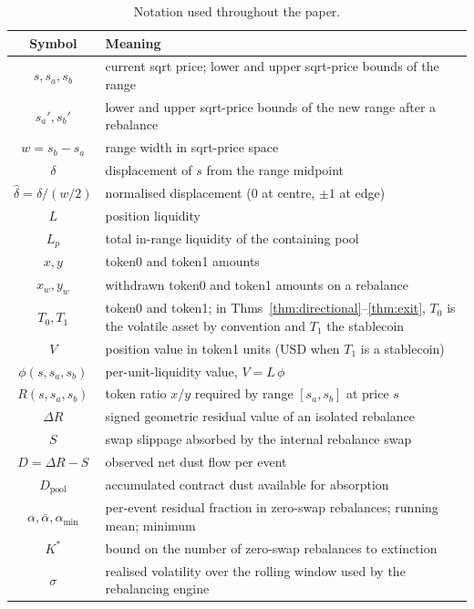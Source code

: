 \documentclass{manuscript}
\renewcommand{\arraystretch}{1.2}
\begin{document}
\begin{table}[H]
\centering
\caption{Notation used throughout the paper.}
\label{tab:notation}
\footnotesize
\renewcommand{\arraystretch}{1.05}
\begin{tabular}{@{}cL{10cm}@{}}
\toprule
Symbol & Meaning \\
\midrule
$s, s_a, s_b$ & current sqrt price; lower and upper sqrt-price bounds of the range \\
$s_a', s_b'$ & lower and upper sqrt-price bounds of the new range after a rebalance \\
$w = s_b - s_a$ & range width in sqrt-price space \\
$\delta$ & displacement of $s$ from the range midpoint \\
$\hat{\delta} = \delta/(w/2)$ & normalised displacement ($0$ at centre, $\pm 1$ at edge) \\
$L$ & position liquidity \\
$L_p$ & total in-range liquidity of the containing pool \\
$x, y$ & token0 and token1 amounts \\
$x_w, y_w$ & withdrawn token0 and token1 amounts on a rebalance \\
$T_0, T_1$ & token0 and token1; in Thms~\ref{thm:directional}--\ref{thm:exit}, $T_0$ is the volatile asset by convention and $T_1$ the stablecoin \\
$V$ & position value in token1 units (USD when $T_1$ is a stablecoin) \\
$\phi(s, s_a, s_b)$ & per-unit-liquidity value, $V = L\,\phi$ \\
$R(s, s_a, s_b)$ & token ratio $x/y$ required by range $[s_a, s_b]$ at price $s$ \\
$\Delta R$ & signed geometric residual value of an isolated rebalance \\
$S$ & swap slippage absorbed by the internal rebalance swap \\
$D = \Delta R - S$ & observed net dust flow per event \\
$D_{\text{pool}}$ & accumulated contract dust available for absorption \\
$\alpha, \bar\alpha, \alpha_{\min}$ & per-event residual fraction in zero-swap rebalances; running mean; minimum \\
$K^*$ & bound on the number of zero-swap rebalances to extinction \\
$\sigma$ & realised volatility over the rolling window used by the rebalancing engine \\
\bottomrule
\end{tabular}
\end{table}
\end{document}
